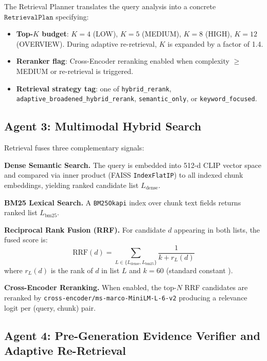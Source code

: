 \documentclass[conference]{IEEEtran}
\begin{document}
The Retrieval Planner translates the query analysis into a concrete
$\texttt{RetrievalPlan}$ specifying:
\begin{itemize}
  \item \textbf{Top-$K$ budget}: $K=4$ (LOW), $K=5$ (MEDIUM), $K=8$ (HIGH),
        $K=12$ (OVERVIEW). During adaptive re-retrieval, $K$ is expanded by a
        factor of 1.4.
  \item \textbf{Reranker flag}: Cross-Encoder reranking enabled when
        complexity $\geq$ MEDIUM or re-retrieval is triggered.
  \item \textbf{Retrieval strategy tag}: one of
        \texttt{hybrid\_rerank}, \texttt{adaptive\_broadened\_hybrid\_rerank},
        \texttt{semantic\_only}, or \texttt{keyword\_focused}.
\end{itemize}

\subsection{Agent 3: Multimodal Hybrid Search}
\label{subsec:agent3}

Retrieval fuses three complementary signals:

\textbf{Dense Semantic Search.} The query is embedded into 512-d CLIP vector
space and compared via inner product (FAISS \texttt{IndexFlatIP}) to all
indexed chunk embeddings, yielding ranked candidate list $L_{\text{dense}}$.

\textbf{BM25 Lexical Search.} A \texttt{BM25Okapi} \cite{robertson2009probabilistic}
index over chunk text fields returns ranked list $L_{\text{bm25}}$.

\textbf{Reciprocal Rank Fusion (RRF).} For candidate $d$ appearing in
both lists, the fused score is:
\begin{equation}
  \text{RRF}(d) = \sum_{L \in \{L_{\text{dense}}, L_{\text{bm25}}\}}
  \frac{1}{k + r_L(d)}
  \label{eq:rrf}
\end{equation}
where $r_L(d)$ is the rank of $d$ in list $L$ and $k=60$ (standard
constant \cite{cormack2009reciprocal}).

\textbf{Cross-Encoder Reranking.} When enabled, the top-$N$ RRF candidates
are reranked by \texttt{cross-encoder/ms-marco-MiniLM-L-6-v2}
\cite{nogueira2019passage} producing a relevance logit per
(query, chunk) pair.

\subsection{Agent 4: Pre-Generation Evidence Verifier and Adaptive
Re-Retrieval}
\label{subsec:agent4}
\end{document}
